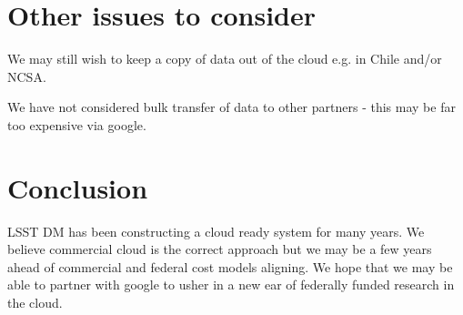 
\section{Other issues to consider}
We may still wish to keep a copy of data out of the cloud e.g. in Chile and/or NCSA.

We have not considered bulk transfer of data to other partners - this may be far too expensive via google.

\section{Conclusion}

LSST \gls{DM} has been constructing a cloud ready system for many years. We believe commercial cloud is the correct approach but we may be a few years ahead of commercial and federal cost models aligning. We hope that we may be able to partner with google to usher in a new ear of federally funded research in the cloud.

~

